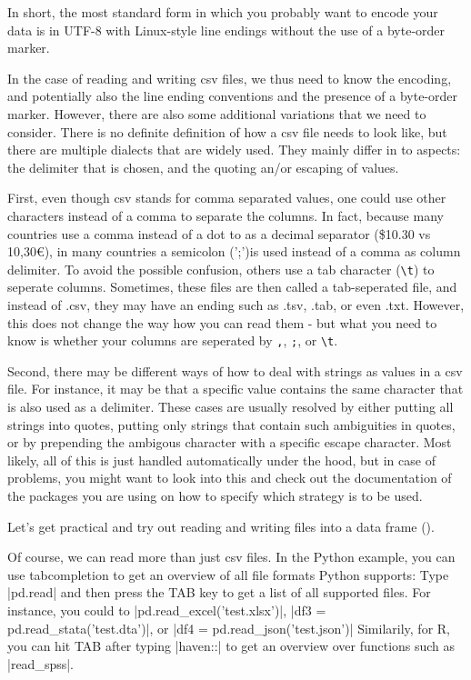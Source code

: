 In short, the most standard form in which you probably want to encode your data is in UTF-8 with Linux-style line endings without the use of a byte-order marker.


In the case of reading and writing csv files, we thus need to know the encoding, and potentially also the line ending conventions and the presence of a byte-order marker. However, there are also some additional variations that we need to consider. There is no definite definition of how a csv file needs to look like, but there are multiple dialects that are widely used. They mainly differ in to aspects: the delimiter that is chosen, and the quoting an/or escaping of values.

First, even though csv stands for comma separated values, one could use other characters instead of a comma to separate the columns. In fact, because many countries use a comma instead of a dot to as a decimal separator (\$10.30 vs 10,30€), in many countries a semicolon (';')is used instead of a comma as column delimiter. To avoid the possible confusion, others use a tab character (\texttt{\textbackslash t}) to seperate columns. Sometimes, these files are then called a tab-seperated file, and instead of .csv, they may have an ending such as .tsv, .tab, or even .txt. However, this does not change the way how you can read them - but what you need to know is whether your columns are seperated by \texttt{,}, \texttt{;}, or \texttt{\textbackslash t}. 

Second, there may be different ways of how to deal with strings as values in a csv file. For instance, it may be that a specific value contains the same character that is also used as a delimiter. These cases are usually resolved by either putting all strings into quotes, putting only strings that contain such ambiguities in quotes, or by prepending the ambigous character with a specific escape character. Most likely, all of this is just handled automatically under the hood, but in case of problems, you might want to look into this and check out the documentation of the packages you are using on how to specify which strategy is to be used.

Let's get practical and try out reading and writing files into a data frame ().


Of course, we can read more than just csv files. In the Python
example, you can use tabcompletion to get an overview of all file
formats Python supports: Type |pd.read| and then press the TAB key to
get a list of all supported files. For instance, you could to
|pd.read_excel('test.xlsx')|, |df3 = pd.read_stata('test.dta')|, or
|df4 = pd.read_json('test.json')| Similarily, for R, you can hit TAB
after typing |haven::| to get an overview over functions such as
|read_spss|.


